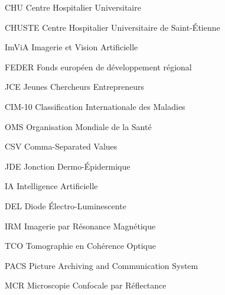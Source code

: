 
            {CHU}
            {Centre Hospitalier Universitaire}
            
            {CHUSTE}
            {Centre Hospitalier Universitaire de Saint-Étienne}
            
            {ImViA}
            {Imagerie et Vision Artificielle}
            
            {FEDER}
            {Fonds européen de développement régional}

            {JCE}
            {Jeunes Chercheurs Entrepreneurs}
  
            {CIM-10}
            {Classification Internationale des Maladies}   
            
            {OMS}
            {Organisation Mondiale de la Santé}    
            
            {CSV}
            {Comma-Separated Values}

            {JDE}
            {Jonction Dermo-Épidermique}
            
            {IA}
            {Intelligence Artificielle}
            
            {DEL}
            {Diode Électro-Luminescente}
            
            {IRM}
            {Imagerie par Résonance Magnétique}
            
            {TCO}
            {Tomographie en Cohérence Optique}

            {PACS}
            {Picture Archiving and Communication System}
            
            {MCR}
            {Microscopie Confocale par Réflectance}
            
